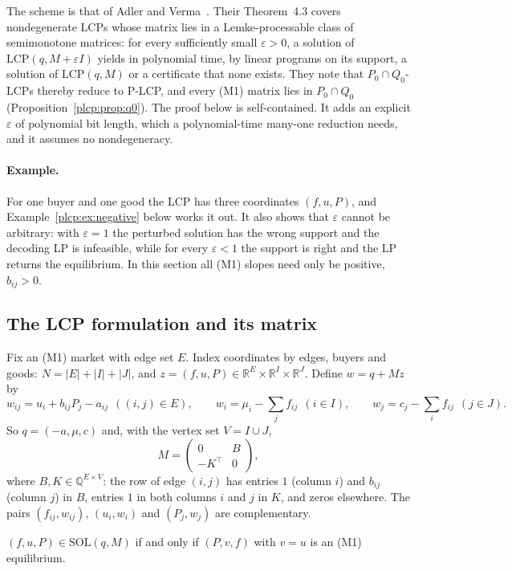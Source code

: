 The scheme is that of Adler and Verma~\cite[\S4]{av11}. Their Theorem~4.3 covers nondegenerate LCPs whose matrix lies in a Lemke-processable class of semimonotone matrices: for every sufficiently small $\varepsilon>0$, a solution of $\mathrm{LCP}(q,M+\varepsilon I)$ yields in polynomial time, by linear programs on its support, a solution of $\mathrm{LCP}(q,M)$ or a certificate that none exists. They note that $P_0\cap Q_0$-LCPs thereby reduce to P-LCP, and every (M1) matrix lies in $P_0\cap Q_0$ (Proposition~\ref{plcp:prop:q0}). The proof below is self-contained. It adds an explicit $\varepsilon$ of polynomial bit length, which a polynomial-time many-one reduction needs, and it assumes no nondegeneracy.

\paragraph{Example.} For one buyer and one good the LCP has three coordinates $(f,u,P)$, and
Example~\ref{plcp:ex:negative} below works it out. It also shows that $\varepsilon$ cannot be arbitrary: with
$\varepsilon=1$ the perturbed solution has the wrong support and the decoding LP is infeasible, while for every $\varepsilon<1$ the support is right and the LP returns the equilibrium. In this section all (M1) slopes need only be positive, $b_{ij}>0$.

\subsection{The LCP formulation and its matrix}

Fix an (M1) market with edge set $E$. Index coordinates by edges, buyers and goods:
$N=|E|+|I|+|J|$, and $z=(f,u,P)\in\mathbb R^E\times\mathbb R^I\times\mathbb R^J$. Define $w=q+Mz$ by
\[
  w_{ij}=u_i+b_{ij}P_j-a_{ij}\ \ ((i,j)\in E),\qquad
  w_i=\mu_i-\sum_{j}f_{ij}\ \ (i\in I),\qquad
  w_j=c_j-\sum_{i}f_{ij}\ \ (j\in J).
\]
So $q=(-a,\mu,c)$ and, with the vertex set $V=I\cup J$,
\[
  M=\begin{pmatrix}0&B\\-K^{\top}&0\end{pmatrix},
\]
where $B,K\in\mathbb Q^{E\times V}$: the row of edge $(i,j)$ has entries $1$ (column $i$) and $b_{ij}$
(column $j$) in $B$, entries $1$ in both columns $i$ and $j$ in $K$, and zeros elsewhere. The pairs
$(f_{ij},w_{ij})$, $(u_i,w_i)$ and $(P_j,w_j)$ are complementary.

\begin{lemma}\label{plcp:lem:formulation}
$(f,u,P)\in\mathrm{SOL}(q,M)$ if and only if $(P,v,f)$ with $v=u$ is an (M1) equilibrium.
\end{lemma}

